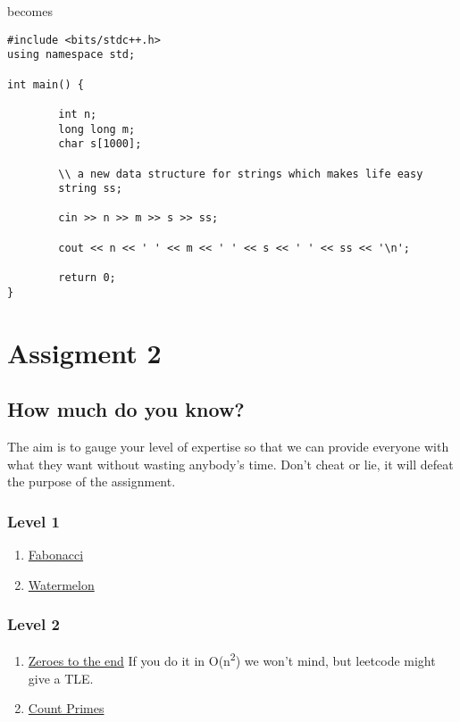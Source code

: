 \documentclass[13pt, oneside, a4paper]{book}
\begin{document}
becomes

\begin{verbatim}
#include <bits/stdc++.h>
using namespace std;

int main() {

        int n;
        long long m;
        char s[1000];

        \\ a new data structure for strings which makes life easy
        string ss;

        cin >> n >> m >> s >> ss;

        cout << n << ' ' << m << ' ' << s << ' ' << ss << '\n';

        return 0;
}
\end{verbatim}


\clearpage

\chapter{Assigment 2}
\section{How much do you know?}
The aim is to gauge your level of expertise so that we can provide everyone with what they want without wasting
anybody's time. Don't cheat or lie, it will defeat the purpose of the assignment.

\subsection{Level 1}
\begin{enumerate}
        \item \href{https://leetcode.com/problems/fibonacci-number/}{Fabonacci}
        \item \href{https://codeforces.com/contest/4/problem/A}{Watermelon}
\end{enumerate}

\subsection{Level 2}
\begin{enumerate}
        \item \href{https://leetcode.com/problems/move-zeroes/}{Zeroes to the end} If you do it in O(n\textsuperscript{2}) we won't mind, but leetcode might give a TLE.
        \item \href{https://leetcode.com/problems/count-primes/}{Count Primes}
\end{enumerate}
\end{document}
